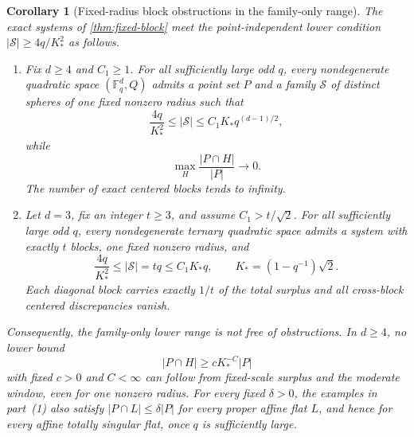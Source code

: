 \documentclass[11pt,letterpaper]{amsart}
\newtheorem{corollary}[corollary]{Corollary}
\theoremstyle{definition}
\theoremstyle{remark}
\newcommand{\1}{\mathbf 1}
\begin{document}
\begin{corollary}[Fixed-radius block obstructions in the family-only range]\label{cor:fixed-no-proportional}
The exact systems of \cref{thm:fixed-block} meet the point-independent lower condition $|\mathcal S|\ge4q/K_*^2$ as follows.
\begin{enumerate}[label=\textup{(\arabic*)}]
\item Fix $d\ge4$ and $C_1\ge1$.  For all sufficiently large odd $q$, every nondegenerate quadratic space $(\mathbb F_q^d,Q)$ admits a point set $P$ and a family $\mathcal S$ of distinct spheres of one fixed nonzero radius such that
\begin{equation}\label{eq:fixed-moderate-window}
 \frac{4q}{K_*^2}\le|\mathcal S|
 \le C_1K_*q^{(d-1)/2},
\end{equation}
while
\begin{equation}\label{eq:fixed-no-hyperplane}
 \max_H\frac{|P\cap H|}{|P|}\longrightarrow0.
\end{equation}
The number of exact centered blocks tends to infinity.
\item Let $d=3$, fix an integer $t\ge3$, and assume $C_1>t/\sqrt2$.  For all sufficiently large odd $q$, every nondegenerate ternary quadratic space admits a system with exactly $t$ blocks, one fixed nonzero radius, and
\begin{equation}\label{eq:d3-family-only-window}
 \frac{4q}{K_*^2}\le|\mathcal S|=tq
 \le C_1K_*q,
 \qquad
 K_*=(1-q^{-1})\sqrt2.
\end{equation}
Each diagonal block carries exactly $1/t$ of the total surplus and all cross-block centered discrepancies vanish.
\end{enumerate}
Consequently, the family-only lower range is not free of obstructions.  In $d\ge4$, no lower bound
\[
 |P\cap H|\ge cK_*^{-C}|P|
\]
with fixed $c>0$ and $C<\infty$ can follow from fixed-scale surplus and the moderate window, even for one nonzero radius.  For every fixed $\delta>0$, the examples in part~\textup{(1)} also satisfy $|P\cap L|\le\delta|P|$ for every proper affine flat $L$, and hence for every affine totally singular flat, once $q$ is sufficiently large.
\end{corollary}
\end{document}
